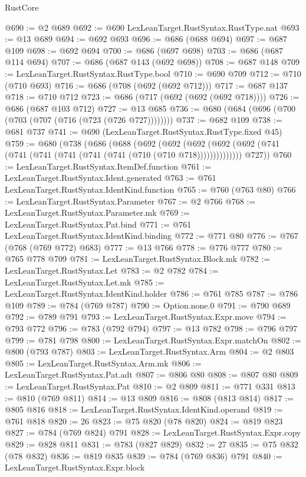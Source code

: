\begin{lexlean}{RustCore}
\begin{coremodule}
@690 := @2 @689
@692 := @690 LexLeanTarget.RustSyntax.RustType.nat
@693 := @13 @689
@694 := @692 @693
@696 := @686 (@688 @694)
@697 := @687 @109
@698 := @692 @694
@700 := @686 (@697 @698)
@703 := @686 (@687 @114 @694)
@707 := @686 (@687 @143 (@692 @698))
@708 := @687 @148
@709 := LexLeanTarget.RustSyntax.RustType.bool
@710 := @690 @709
@712 := @710 (@710 @693)
@716 := @686 (@708 (@692 (@692 @712)))
@717 := @687 @137
@718 := @710 @712
@723 := @686 (@717 (@692 (@692 (@692 @718))))
@726 := @686 (@687 @103 @712)
@727 := @13 @685
@736 := @680 (@684 (@696 (@700 (@703 (@707 (@716 (@723 (@726 @727))))))))
@737 := @682 @109
@738 := @681 @737
@741 := @690 (LexLeanTarget.RustSyntax.RustType.fixed @45)
@759 := @680
    (@738
      (@686
        (@688
          (@692
            (@692
              (@692 (@692 (@692 (@741 (@741 (@741 (@741 (@741 (@741 (@710 (@710 @718))))))))))))))
        @727))
@760 := LexLeanTarget.RustSyntax.ItemDef.function
@761 := LexLeanTarget.RustSyntax.Ident.generated
@763 := @761 LexLeanTarget.RustSyntax.IdentKind.function
@765 := @760 (@763 @80)
@766 := LexLeanTarget.RustSyntax.Parameter
@767 := @2 @766
@768 := LexLeanTarget.RustSyntax.Parameter.mk
@769 := LexLeanTarget.RustSyntax.Pat.bind
@771 := @761 LexLeanTarget.RustSyntax.IdentKind.binding
@772 := @771 @80
@776 := @767 (@768 (@769 @772) @683)
@777 := @13 @766
@778 := @776 @777
@780 := @765 @778 @709
@781 := LexLeanTarget.RustSyntax.Block.mk
@782 := LexLeanTarget.RustSyntax.Let
@783 := @2 @782
@784 := LexLeanTarget.RustSyntax.Let.mk
@785 := LexLeanTarget.RustSyntax.IdentKind.holder
@786 := @761 @785
@787 := @786 @109
@789 := @784 (@769 @787)
@790 := Option.none.{0}
@791 := @790 @689
@792 := @789 @791
@793 := LexLeanTarget.RustSyntax.Expr.move
@794 := @793 @772
@796 := @783 (@792 @794)
@797 := @13 @782
@798 := @796 @797
@799 := @781 @798
@800 := LexLeanTarget.RustSyntax.Expr.matchOn
@802 := @800 (@793 @787)
@803 := LexLeanTarget.RustSyntax.Arm
@804 := @2 @803
@805 := LexLeanTarget.RustSyntax.Arm.mk
@806 := LexLeanTarget.RustSyntax.Pat.adt
@807 := @806 @80
@808 := @807 @80
@809 := LexLeanTarget.RustSyntax.Pat
@810 := @2 @809
@811 := @771 @331
@813 := @810 (@769 @811)
@814 := @13 @809
@816 := @808 (@813 @814)
@817 := @805 @816
@818 := LexLeanTarget.RustSyntax.IdentKind.operand
@819 := @761 @818
@820 := 26
@823 := @75 @820 (@78 @820)
@824 := @819 @823
@827 := @784 (@769 @824) @791
@828 := LexLeanTarget.RustSyntax.Expr.copy
@829 := @828 @811
@831 := @783 (@827 @829)
@832 := 27
@835 := @75 @832 (@78 @832)
@836 := @819 @835
@839 := @784 (@769 @836) @791
@840 := LexLeanTarget.RustSyntax.Expr.block

\end{coremodule}
\end{lexlean}
